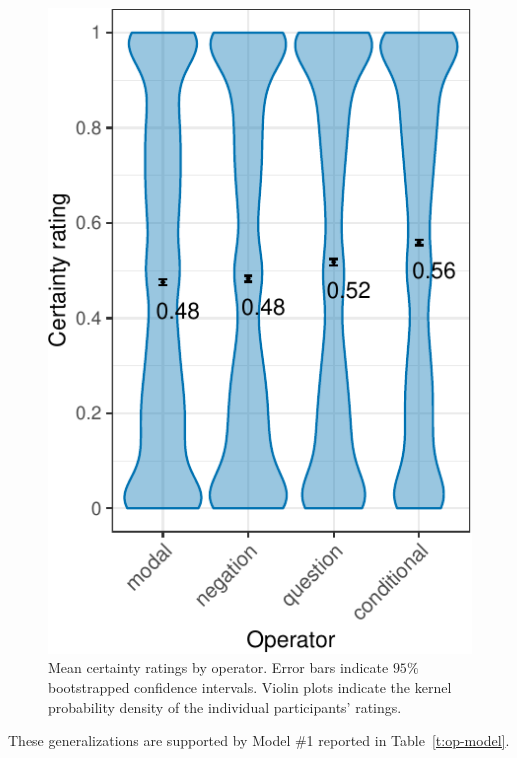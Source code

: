 \documentclass[a4paper,12pt,twoside]{article}
\begin{document}

			\begin{figure}[ht]
				\centering
				\includegraphics[scale = .8]{operator-graph-1}
				\caption{Mean certainty ratings by operator. Error bars indicate $95\%$ bootstrapped confidence intervals. Violin plots indicate the kernel probability density of the individual participants’ ratings.}
				\label{fig:op-ratings}
			\end{figure}

   
   These generalizations are supported by Model \#1 reported in Table~\ref{t:op-model}.
\end{document}
